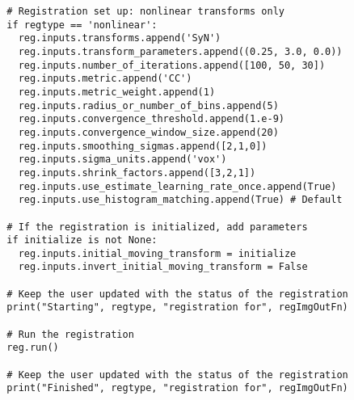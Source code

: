 \begin{lstlisting}
  # Registration set up: nonlinear transforms only
  if regtype == 'nonlinear':
    reg.inputs.transforms.append('SyN')
    reg.inputs.transform_parameters.append((0.25, 3.0, 0.0))
    reg.inputs.number_of_iterations.append([100, 50, 30])
    reg.inputs.metric.append('CC')
    reg.inputs.metric_weight.append(1)
    reg.inputs.radius_or_number_of_bins.append(5)
    reg.inputs.convergence_threshold.append(1.e-9)
    reg.inputs.convergence_window_size.append(20)
    reg.inputs.smoothing_sigmas.append([2,1,0])
    reg.inputs.sigma_units.append('vox')
    reg.inputs.shrink_factors.append([3,2,1])
    reg.inputs.use_estimate_learning_rate_once.append(True)
    reg.inputs.use_histogram_matching.append(True) # Default

  # If the registration is initialized, add parameters
  if initialize is not None:
    reg.inputs.initial_moving_transform = initialize
    reg.inputs.invert_initial_moving_transform = False

  # Keep the user updated with the status of the registration
  print("Starting", regtype, "registration for", regImgOutFn)
    
  # Run the registration
  reg.run()
    
  # Keep the user updated with the status of the registration
  print("Finished", regtype, "registration for", regImgOutFn)

\end{lstlisting}